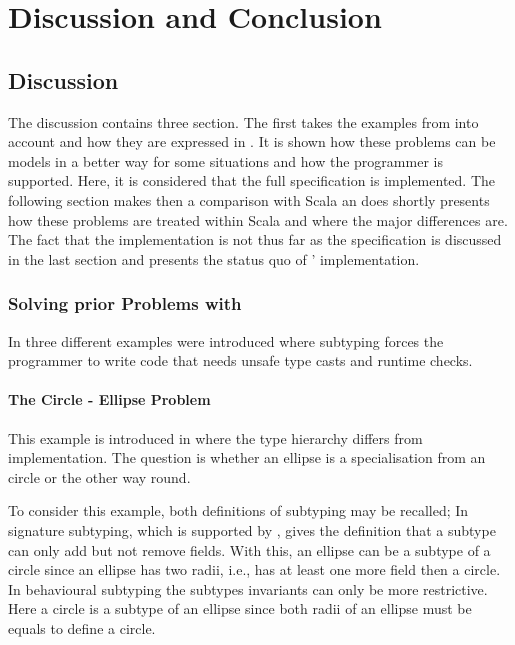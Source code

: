 \chapter{Discussion and Conclusion}
\section{Discussion}
\label{ctr:discussion}
The discussion contains three section. The first takes the examples from
 into account and how they are expressed
in \ooplss. It is shown how these problems can be models in a better
way for some situations and how the programmer is supported. Here, it
is considered that the full specification is implemented. The following
section makes then a comparison with Scala an does shortly presents how
these problems are treated within Scala and where the major differences
are. The fact that the implementation is not thus far as the specification
is discussed in the last section and presents the status quo of \ooplss'
implementation.

\subsection{Solving prior Problems with \ooplss}
In  three different examples were
introduced where subtyping forces the programmer to write code that
needs unsafe type casts and runtime checks.

\subsubsection{The Circle - Ellipse Problem}
This example is introduced in  where the type
hierarchy differs from implementation. The question is whether an ellipse
is a specialisation from an circle or the other way round.

To consider this example, both definitions of subtyping may be recalled;
In signature subtyping, which is supported by \ooplss, gives the
definition that a subtype can only add but not remove fields. With this,
an ellipse can be a subtype of a circle since an ellipse has two radii,
i.e., has at least one more field then a circle. In behavioural subtyping
the subtypes invariants can only be more restrictive. Here a circle is
a subtype of an ellipse since both radii of an ellipse must be equals
to define a circle.

